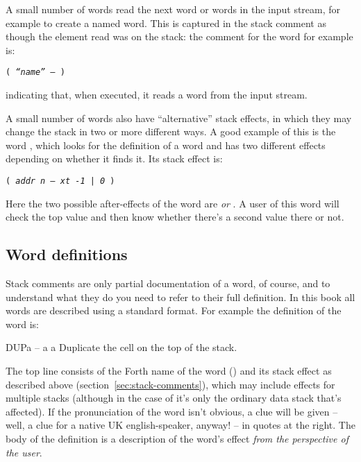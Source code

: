 A small number of words read the next word or words in the input
stream, for example to create a named word. This is captured in the
stack comment as though the element read was on the stack: the comment
for the word  for example is:

\begin{center}
  \texttt{( \textit{``name'' --} )}
\end{center}

\noindent indicating that, when executed, it reads a word from the
input stream.

A small number of words also have ``alternative'' stack effects, in
which they may change the stack in two or more different ways. A good
example of this is the word , which looks for the
definition of a word and has two different effects depending on
whether it finds it. Its stack effect is:

\begin{center}
  \texttt{( \textit{addr n -- xt -1 | 0} )}
\end{center}

\noindent Here the two possible after-effects of the word are
 \emph{or} . A user of this word will check the top
value and then know whether there's a second value there or not.

\subsection{Word definitions}
\label{sec:word-definitions}

Stack comments are only partial documentation of a word, of course,
and to understand what they do you need to refer to their full
definition. In this book all words are described using a standard
format. For example the definition of the word  is:

\begin{defword}[dupe]{DUP}{a -- a a}
  Duplicate the cell on the top of the stack.
\end{defword}

The top line consists of the Forth name of the word () and
its stack effect as described above
(section~\ref{sec:stack-comments}), which may include effects for
multiple stacks (although in the case of  it's only the
ordinary data stack that's affected). If the pronunciation of the word
isn't obvious, a clue will be given -- well, a clue for a native UK
english-speaker, anyway! -- in quotes at the right. The body of the
definition is a description of the word's effect \emph{from the
  perspective of the user}.

